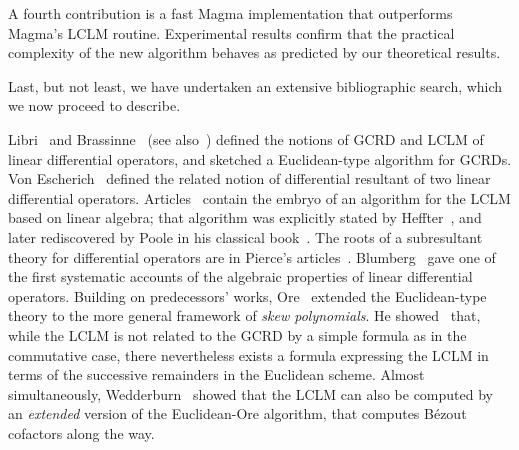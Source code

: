 \documentclass{sig-alt-full}
\begin{document}
A fourth contribution is a fast Magma implementation
that outperforms Magma's  LCLM routine.
Experimental results 
confirm that the practical complexity of the new algorithm behaves as predicted by our
theoretical results. 

Last, but not least, we have undertaken an extensive bibliographic search,
which we now proceed to describe.

\medskip {} Libri~\cite{Libri1833} and
Brassinne~\cite{Brassinne1864} (see also~\cite{Demidov83}) defined the notions
of GCRD and LCLM of linear differential operators, and sketched a
Euclidean-type algorithm for GCRDs. Von
Escherich~\cite{Escherich1883} defined the related notion of differential
resultant of two linear differential operators. 
Articles~\cite{Brassinne1864,Escherich1883} contain the embryo of an algorithm for the LCLM
based on linear algebra; that algorithm was explicitly stated by
Heffter~\cite{Heffter1896}, and later rediscovered by Poole in his classical
book~\cite{Poole36}. The roots of a subresultant theory for differential
operators are in Pierce's articles~\cite{Pierce1903,Pierce1904}.
Blumberg~\cite{Blumberg1912} gave one of the first systematic accounts of the
algebraic properties of linear differential operators. Building on
predecessors' works, Ore~\cite{Ore32,Ore33} extended the Euclidean-type theory
to the more general framework of \emph{skew polynomials}. He
showed~\cite[Theorem~8, \S3]{Ore33} that, while the LCLM is not related to the
GCRD by a simple formula as in the commutative case, there nevertheless exists
a formula expressing the LCLM in terms of the successive remainders in the
Euclidean scheme.
Almost simultaneously, Wedderburn~\cite[\S7-8]{Wedderburn1932} showed that the LCLM can also be computed
by an \emph{extended\/} version of the Euclidean-Ore algorithm, that computes
Bézout cofactors along the way.
\end{document}
